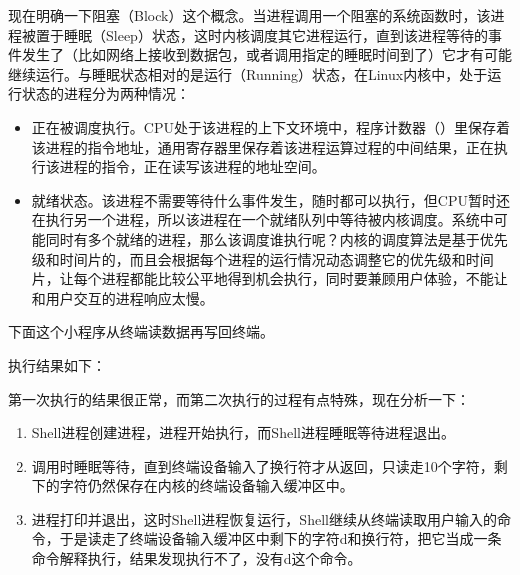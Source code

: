 现在明确一下阻塞（Block）这个概念。当进程调用一个阻塞的系统函数时，该进程被置于睡眠（Sleep）状态，这时内核调度其它进程运行，直到该进程等待的事件发生了（比如网络上接收到数据包，或者调用指定的睡眠时间到了）它才有可能继续运行。与睡眠状态相对的是运行（Running）状态，在Linux内核中，处于运行状态的进程分为两种情况：


\begin{itemize}

\item 正在被调度执行。CPU处于该进程的上下文环境中，程序计数器（）里保存着该进程的指令地址，通用寄存器里保存着该进程运算过程的中间结果，正在执行该进程的指令，正在读写该进程的地址空间。

\item 就绪状态。该进程不需要等待什么事件发生，随时都可以执行，但CPU暂时还在执行另一个进程，所以该进程在一个就绪队列中等待被内核调度。系统中可能同时有多个就绪的进程，那么该调度谁执行呢？内核的调度算法是基于优先级和时间片的，而且会根据每个进程的运行情况动态调整它的优先级和时间片，让每个进程都能比较公平地得到机会执行，同时要兼顾用户体验，不能让和用户交互的进程响应太慢。
\end{itemize}


下面这个小程序从终端读数据再写回终端。





执行结果如下：




第一次执行的结果很正常，而第二次执行的过程有点特殊，现在分析一下：


\begin{enumerate}

\item Shell进程创建进程，进程开始执行，而Shell进程睡眠等待进程退出。

\item {}调用时睡眠等待，直到终端设备输入了换行符才从返回，只读走10个字符，剩下的字符仍然保存在内核的终端设备输入缓冲区中。

\item {}进程打印并退出，这时Shell进程恢复运行，Shell继续从终端读取用户输入的命令，于是读走了终端设备输入缓冲区中剩下的字符d和换行符，把它当成一条命令解释执行，结果发现执行不了，没有d这个命令。
\end{enumerate}


